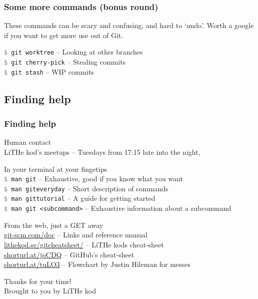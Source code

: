 \documentclass{beamer}
\newcommand{\command}[1]{\texttt{\textcolor{gray}{\$} {#1}}}
\begin{document}
\begin{frame}[fragile]
  \frametitle{Some more commands (bonus round)}
  These commands can be scary and confusing, and hard to `undo'. Worth a google if you
  want to get more use out of Git.
  \vspace{1em}
  
  \command{git worktree} -- Looking at other branches \\
  \command{git cherry-pick} -- Stealing commits \\
  \command{git stash} -- WIP commits \\
    
\end{frame}

\subsection{Finding help}

\begin{frame}[fragile]
  \frametitle{Finding help}

  Human contact \\
  \hspace{1em} LiTHe kod's meetups -- Tuesdays from 17:15 late into the night, \\
  \vspace{1em}
  \pause

  In your terminal at your fingetips \\
  \hspace{1em} \command{man git} -- Exhaustive, good if you know what you want \\
  \hspace{1em} \command{man giteveryday} -- Short description of commands \\
  \hspace{1em} \command{man gittutorial} -- A guide for getting started \\
  \hspace{1em} \command{man git <subcommand>} -- Exhaustive information about a subcommand\\
  \vspace{1em}
  \pause

  From the web, just a GET away \\
  \hspace{1em} \url{git-scm.com/doc} -- Links and reference manual \\
  \hspace{1em} \url{lithekod.se/gitcheatsheet/} -- LiTHe kods cheat-sheet \\
  \hspace{1em} \url{shorturl.at/jpCDQ} -- GitHub's cheat-sheet \\
  \hspace{1em} \url{shorturl.at/tuLO3} -- Flowchart by Justin Hileman for messes\\

\end{frame}

\begin{frame}[fragile]
  \begin{center}
    \Huge Thanks for your time! \\[0.75em]
    \small Brought to you by LiTHe kod
  \end{center}
\end{frame}
\end{document}
